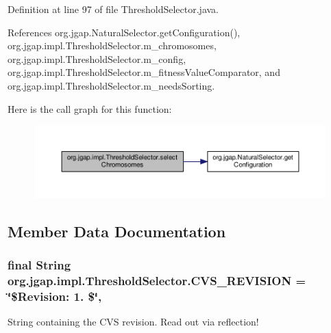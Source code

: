 Definition at line 97 of file Threshold\-Selector.\-java.



References org.\-jgap.\-Natural\-Selector.\-get\-Configuration(), org.\-jgap.\-impl.\-Threshold\-Selector.\-m\-\_\-chromosomes, org.\-jgap.\-impl.\-Threshold\-Selector.\-m\-\_\-config, org.\-jgap.\-impl.\-Threshold\-Selector.\-m\-\_\-fitness\-Value\-Comparator, and org.\-jgap.\-impl.\-Threshold\-Selector.\-m\-\_\-needs\-Sorting.



Here is the call graph for this function\-:
\nopagebreak
\begin{figure}[H]
\begin{center}
\leavevmode
\includegraphics[width=350pt]{classorg_1_1jgap_1_1impl_1_1_threshold_selector_a0503b950969a0c79b42963391ca131f5_cgraph}
\end{center}
\end{figure}




\subsection{Member Data Documentation}
\hypertarget{classorg_1_1jgap_1_1impl_1_1_threshold_selector_a2eb4c7aad8839a9485f499ee9605f078}{
\subsubsection[{C\-V\-S\-\_\-\-R\-E\-V\-I\-S\-I\-O\-N}]{\setlength{\rightskip}{0pt plus 5cm}final String org.\-jgap.\-impl.\-Threshold\-Selector.\-C\-V\-S\-\_\-\-R\-E\-V\-I\-S\-I\-O\-N = \char`\"{}\$Revision\-: 1. \$\char`\"{}\hspace{0.3cm}{\ttfamily [static]}, {\ttfamily [private]}}}\label{classorg_1_1jgap_1_1impl_1_1_threshold_selector_a2eb4c7aad8839a9485f499ee9605f078}
String containing the C\-V\-S revision. Read out via reflection! 

